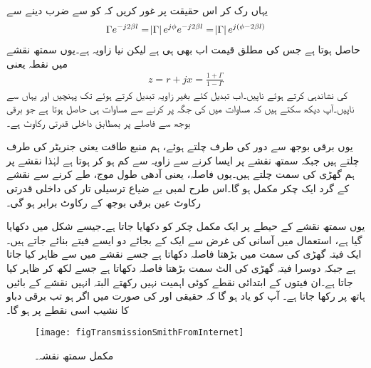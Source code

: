 یہاں رک کر اس حقیقت پر غور کریں کہ  کو  سے ضرب دینے سے
\begin{align*}
\Gamma e^{-j2 \beta l}= \abs{\Gamma} e^{j \phi} e^{-j 2 \beta l}= \abs{\Gamma} e^{j(\phi-2\beta l)}
\end{align*}
حاصل ہوتا ہے جس کی مطلق قیمت اب بھی  ہی ہے  لیکن نیا زاویہ  ہے۔یوں سمتھ نقشے میں نقطہ  یعنی 
\begin{align}\label{مساوات_ترسیلی_داخلی_رکاوٹ_سمتھ_پ}
z=r+j x=\frac{1+\Gamma}{1-\Gamma}
\end{align}
کی نشاندہی کرتے ہوئے   ناپیں۔اب  تبدیل کئے بغیر زاویہ تبدیل کرتے ہوئے  تک پہنچیں اور یہاں سے   ناپیں۔آپ دیکھ سکتے ہیں کہ مساوات  میں  کی جگہ  پر کرنے سے مساوات  ہی حاصل ہوتا ہے جو برقی بوجھ سے  فاصلے پر بمطابق  داخلی قدرتی رکاوٹ ہے۔

یوں برقی بوجھ  سے دور  کی طرف چلتے ہوئے، ہم منبع طاقت یعنی جنریٹر کی طرف چلتے ہیں جبکہ سمتھ نقشے پر ایسا کرنے سے زاویہ  سے کم ہو کر  ہوتا ہے لہٰذا نقشے پر ہم گھڑی کی سمت چلتے ہیں۔یوں  فاصلہ، یعنی آدھی طول موج، طے کرنے سے نقشے کے گرد ایک چکر مکمل ہو گا۔اس طرح  لمبی  بے ضیاع ترسیلی تار کی داخلی قدرتی رکاوٹ عین برقی بوجھ کے رکاوٹ برابر ہو گی۔

یوں سمتھ نقشے کے حیطے پر ایک مکمل چکر کو  دکھایا جاتا ہے۔جیسے شکل  میں دکھایا گیا ہے، استعمال میں آسانی کی غرض سے ایک کے بجائے دو ایسے  فیتے بنائے جاتے ہیں۔ایک فیتہ گھڑی کی سمت میں بڑھتا فاصلہ دکھاتا ہے جسے نقشے میں  سے ظاہر کیا جاتا ہے جبکہ دوسرا فیتہ گھڑی کی الٹ سمت بڑھتا فاصلہ دکھاتا ہے جسے  لکھ کر ظاہر کیا جاتا ہے۔ان فیتوں کے ابتدائی نقطے کوئی اہمیت نہیں رکھتے البتہ انہیں نقشے کے بائیں ہاتھ پر رکھا جاتا ہے۔ آپ کو یاد ہو گا کہ حقیقی  اور  کی صورت میں اگر  ہو تب برقی دباو کا نشیب اسی نقطے پر ہو گا۔
\begin{figure}
\centering
\texttt{[image: figTransmissionSmithFromInternet]}
\caption{مکمل سمتھ نقشہ۔}
\label{شکل_ترسیلی_مکمل_سمتھ_نقشہ}
\end{figure} 

